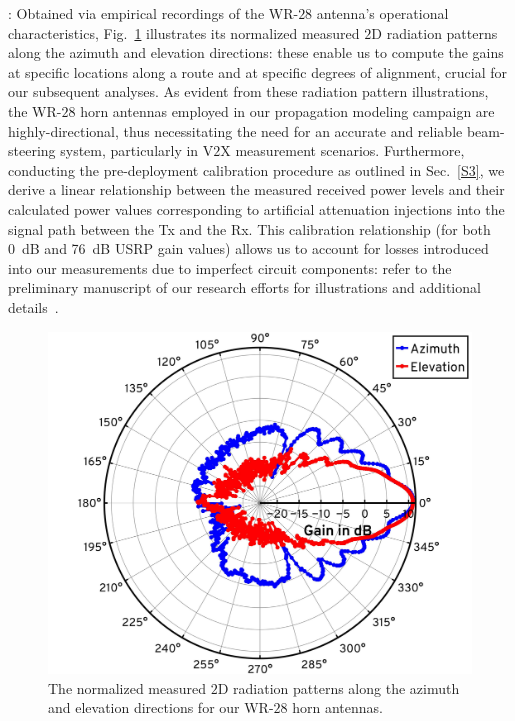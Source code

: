 \documentclass[12pt, draftcls, onecolumn]{IEEEtran}
\begin{document}
{: Obtained via empirical recordings of the WR-$28$ antenna's operational characteristics, Fig.~\ref{F4} illustrates its normalized measured $2$D radiation patterns along the azimuth and elevation directions: these enable us to compute the gains at specific locations along a route and at specific degrees of alignment, crucial for our subsequent analyses. As evident from these radiation pattern illustrations, the WR-$28$ horn antennas employed in our propagation modeling campaign are highly-directional, thus necessitating the need for an accurate and reliable beam-steering system, particularly in V$2$X measurement scenarios. Furthermore, conducting the pre-deployment calibration procedure as outlined in Sec.~\ref{S3}, we derive a linear relationship between the measured received power levels and their calculated power values corresponding to artificial attenuation injections into the signal path between the Tx and the Rx. This calibration relationship (for both \SI{0}{\deci\bel} and \SI{76}{\deci\bel} USRP gain values) allows us to account for losses introduced into our measurements due to imperfect circuit components: refer to the preliminary manuscript of our research efforts for illustrations and additional details~\cite{SPAVE_ICC}.
\begin{figure} [t]
    \centering
    \includegraphics[width=0.55\linewidth]{figs/antenna_pattern_combined.pdf}
    \vspace{-2mm}
    \caption{The normalized measured $2$D radiation patterns along the azimuth and elevation directions for our WR-$28$ horn antennas.}
    \label{F4}
\end{figure}

}
\end{document}
